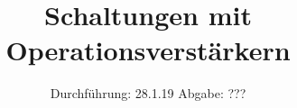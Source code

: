 

\subject{V 51}
\title{Schaltungen mit Operationsverstärkern}
\date{
  Durchführung: 28.1.19
  \hspace{3em}
  Abgabe: ???
}



\maketitle
\thispagestyle{empty}
\tableofcontents
\newpage






\printbibliography




